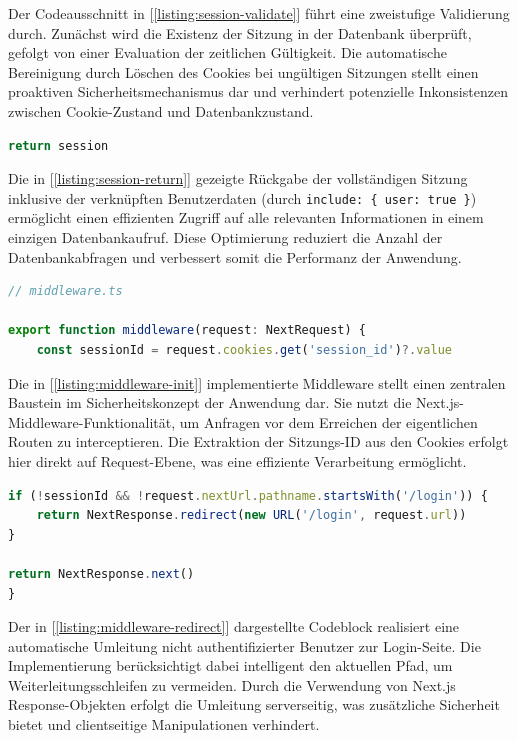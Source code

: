 Der Codeausschnitt in [\ref{listing:session-validate}] führt eine zweistufige Validierung durch. Zunächst wird die Existenz der Sitzung in der Datenbank überprüft, gefolgt von einer Evaluation der zeitlichen Gültigkeit. Die automatische Bereinigung durch Löschen des Cookies bei ungültigen Sitzungen stellt einen proaktiven Sicherheitsmechanismus dar und verhindert potenzielle Inkonsistenzen zwischen Cookie-Zustand und Datenbankzustand.

\begin{lstlisting}[language=JavaScript, caption={Rückgabe der validierten Sitzung.}, label={listing:session-return}]
return session
\end{lstlisting}


Die in [\ref{listing:session-return}] gezeigte Rückgabe der vollständigen Sitzung inklusive der verknüpften Benutzerdaten (durch \texttt{include: \{ user: true \}}) ermöglicht einen effizienten Zugriff auf alle relevanten Informationen in einem einzigen Datenbankaufruf. Diese Optimierung reduziert die Anzahl der Datenbankabfragen und verbessert somit die Performanz der Anwendung.

\begin{lstlisting}[language=JavaScript, caption={Middleware für Routenschutz.}, label={listing:middleware-init}]
// middleware.ts
	
export function middleware(request: NextRequest) {
	const sessionId = request.cookies.get('session_id')?.value
\end{lstlisting}


Die in [\ref{listing:middleware-init}] implementierte Middleware stellt einen zentralen Baustein im Sicherheitskonzept der Anwendung dar. Sie nutzt die Next.js-Middleware-Funktionalität, um Anfragen vor dem Erreichen der eigentlichen Routen zu interceptieren. Die Extraktion der Sitzungs-ID aus den Cookies erfolgt hier direkt auf Request-Ebene, was eine effiziente Verarbeitung ermöglicht.

\begin{lstlisting}[language=JavaScript, caption={Umleitung nicht authentifizierter Anfragen.}, label={listing:middleware-redirect}]
if (!sessionId && !request.nextUrl.pathname.startsWith('/login')) {
	return NextResponse.redirect(new URL('/login', request.url))
}
		
return NextResponse.next()
}
\end{lstlisting}


Der in [\ref{listing:middleware-redirect}] dargestellte Codeblock realisiert eine automatische Umleitung nicht authentifizierter Benutzer zur Login-Seite. Die Implementierung berücksichtigt dabei intelligent den aktuellen Pfad, um Weiterleitungsschleifen zu vermeiden. Durch die Verwendung von Next.js Response-Objekten erfolgt die Umleitung serverseitig, was zusätzliche Sicherheit bietet und clientseitige Manipulationen verhindert.





